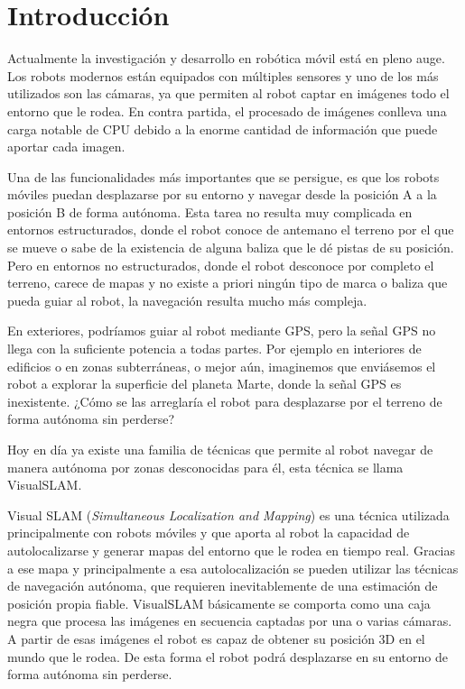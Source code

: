 \chapter{Introducción} \label{cap:introduccion}
\setcounter{page}{1}

Actualmente la investigación y desarrollo en robótica móvil está en pleno auge. Los robots modernos están equipados con múltiples sensores y uno de los más utilizados son las cámaras, ya que permiten al robot captar en imágenes todo el entorno que le rodea. En contra partida, el procesado de imágenes conlleva una carga notable de CPU debido a la enorme cantidad de información que puede aportar cada imagen.

Una de las funcionalidades más importantes que se persigue, es que los robots móviles puedan desplazarse por su entorno y navegar desde la posición A a la posición B de forma autónoma. 
Esta tarea no resulta muy complicada en entornos estructurados, donde el robot conoce de antemano el terreno por el que se mueve o sabe de la existencia de alguna baliza que le dé pistas de su posición.
Pero en entornos no estructurados, donde el robot desconoce por completo el terreno, carece de mapas y no existe a priori ningún tipo de marca o baliza que pueda guiar al robot, la navegación resulta mucho más compleja.

En exteriores, podríamos guiar al robot mediante GPS, pero la señal GPS no llega con la suficiente potencia a todas partes. Por ejemplo en interiores de edificios o en zonas subterráneas, o mejor aún, imaginemos que enviásemos el robot a explorar la superficie del planeta Marte, donde la señal GPS es inexistente. ¿Cómo se las arreglaría el robot para desplazarse por el terreno de forma autónoma sin perderse?

Hoy en día ya existe una familia de técnicas que permite al robot navegar de manera autónoma por zonas desconocidas para él, esta técnica se llama VisualSLAM.


Visual SLAM (\textit{Simultaneous Localization and Mapping}) es una técnica utilizada principalmente con robots móviles y que aporta al robot la capacidad de autolocalizarse y generar mapas del entorno que le rodea en tiempo real. Gracias a ese mapa y principalmente a esa autolocalización se pueden utilizar las técnicas de navegación autónoma, que requieren inevitablemente de una estimación de posición propia fiable. VisualSLAM básicamente se comporta como una caja negra que procesa las imágenes en secuencia captadas por una o varias cámaras. A partir de esas imágenes el robot es capaz de obtener su posición 3D en el mundo que le rodea. De esta forma el robot podrá desplazarse en su entorno de forma autónoma sin perderse.

